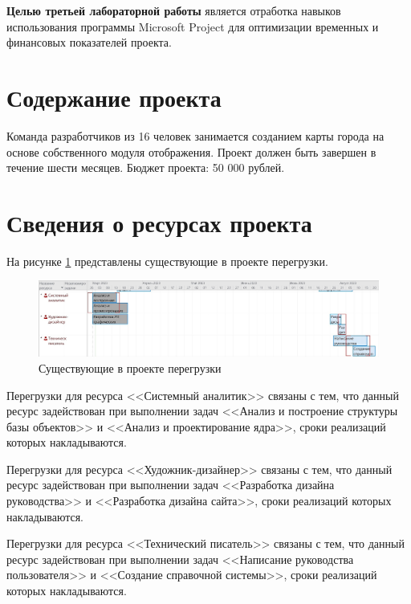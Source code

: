 \textbf{Целью третьей лабораторной работы} является отработка навыков использования программы Microsoft Project для оптимизации временных и финансовых показателей проекта.

\section*{Содержание проекта}

Команда разработчиков из 16 человек занимается созданием карты города на основе собственного модуля отображения. Проект должен быть завершен в течение шести месяцев. Бюджет проекта: 50 000 рублей.

\section*{Сведения о ресурсах проекта}

На рисунке \ref{img:task1-start-overload} представлены существующие в проекте перегрузки.

\begin{figure}[H]
	\begin{center}
		\includegraphics[scale=0.26]{inc/img/task1-start-overload.jpg}
	\end{center}
	\captionsetup{justification=centering}
	\caption{Существующие в проекте перегрузки}
	\label{img:task1-start-overload}
\end{figure}

Перегрузки для ресурса <<Системный аналитик>> связаны с тем, что данный ресурс задействован при выполнении задач <<Анализ и построение структуры базы объектов>> и <<Анализ и проектирование ядра>>, сроки реализаций которых накладываются.

Перегрузки для ресурса <<Художник-дизайнер>> связаны с тем, что данный ресурс задействован при выполнении задач <<Разработка дизайна руководства>> и <<Разработка дизайна сайта>>, сроки реализаций которых накладываются.

Перегрузки для ресурса <<Технический писатель>> связаны с тем, что данный ресурс задействован при выполнении задач <<Написание руководства пользователя>> и <<Создание справочной системы>>, сроки реализаций которых накладываются.

